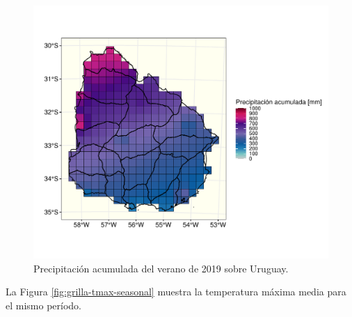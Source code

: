 \documentclass[
  12pt]{article}
\begin{document}
\begin{figure}[H]

{\centering \includegraphics{Manual_Generador_files/figure-latex/grilla-prcp-seasonal-1} 

}

\caption{Precipitación acumulada del verano de 2019 sobre Uruguay.}\label{fig:grilla-prcp-seasonal}
\end{figure}

La Figura \ref{fig:grilla-tmax-seasonal} muestra la temperatura máxima media para el mismo período.
\end{document}
